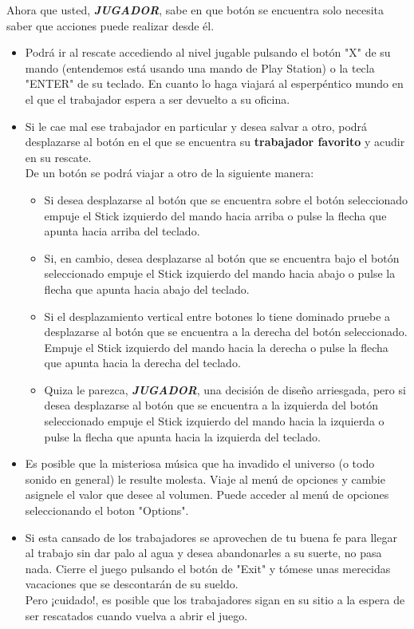 Ahora que usted,  \textit{\textbf{JUGADOR}}, sabe en que botón se encuentra solo necesita saber que acciones puede realizar desde él.
\begin{itemize}
\item
Podrá ir al rescate accediendo al nivel jugable pulsando el botón "X" de su mando (entendemos está usando una mando de Play Station) o la tecla "ENTER" de su teclado. En cuanto lo haga viajará al \textcolor{endeavour}{esperpéntico mundo} en el que el \textcolor{azulWorker}{trabajador} espera a ser devuelto a su oficina.
\item
Si le cae mal ese \textcolor{azulWorker}{trabajador} en particular y desea salvar a otro, podrá desplazarse al botón en el que se encuentra su \textcolor{azulWorker}{\textbf{trabajador favorito}} y acudir en su rescate.\\
De un botón se podrá viajar a otro de la siguiente manera:
\begin{itemize}
\item
Si desea desplazarse al botón que se encuentra sobre el botón seleccionado empuje el Stick izquierdo del mando hacia arriba o pulse la flecha que apunta hacia arriba del teclado.
\item
Si, en cambio, desea desplazarse al botón que se encuentra bajo el botón seleccionado empuje el Stick izquierdo del mando hacia abajo o pulse la flecha que apunta hacia abajo del teclado.
\item
Si el desplazamiento vertical entre botones lo tiene dominado pruebe a  desplazarse al botón que se encuentra a la derecha del botón seleccionado. Empuje el Stick izquierdo del mando hacia la derecha o pulse la flecha que apunta hacia la derecha del teclado.
\item
Quiza le parezca, \textit{\textbf{JUGADOR}}, una decisión de diseño arriesgada, pero si desea desplazarse al botón que se encuentra a la izquierda del botón seleccionado empuje el Stick izquierdo del mando hacia la izquierda o pulse la flecha que apunta hacia la izquierda del teclado.
\end{itemize}
\item
Es posible que la misteriosa música que ha invadido el universo (o todo sonido en general) le resulte molesta. Viaje al menú de opciones y cambie asignele el valor que desee al volumen. Puede acceder al menú de opciones seleccionando el boton "Options".
\item
Si esta cansado de los \textcolor{azulWorker}{trabajadores} se aprovechen de tu buena fe para llegar al trabajo sin dar palo al agua y desea abandonarles a su suerte, no pasa nada. Cierre el juego pulsando el botón de "Exit" y tómese unas merecidas vacaciones que se descontarán de su sueldo.\\
Pero ¡cuidado!, es posible que los \textcolor{azulWorker}{trabajadores} sigan en su sitio a la espera de ser rescatados cuando vuelva a abrir el juego.
\end{itemize}

